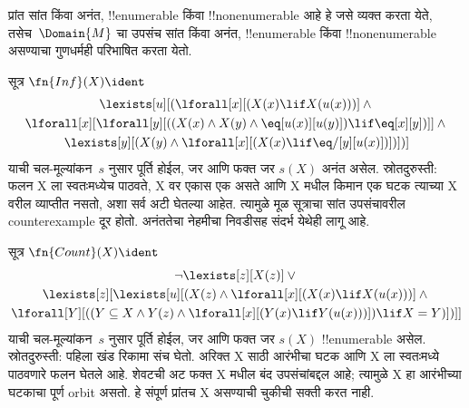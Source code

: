 \documentclass[../../../include/open-logic-section]{subfiles}
\begin{document}


\begin{explain}
प्रांत सांत किंवा अनंत, !!{enumerable} किंवा
!!{nonenumerable} आहे हे जसे व्यक्त करता येते,
तसेच~$\Domain{M}$ चा उपसंच सांत किंवा अनंत,
!!{enumerable} किंवा !!{nonenumerable} असण्याचा
गुणधर्मही परिभाषित करता येतो.
\end{explain}

\begin{prop}
सूत्र $\fn{Inf}(X) \ident$
\begin{multline*}
\lexists[u][(\lforall[x][(X(x) \lif X(u(x)))] \land {} \\
\lforall[x][\lforall[y][((X(x) \land X(y) \land \eq[u(x)][u(y)]) \lif
      \eq[x][y])]] \land {} \\
\lexists[y][(X(y) \land \lforall[x][(X(x) \lif \eq/[y][u(x)])])])]
\end{multline*}
याची चल-मूल्यांकन~$s$ नुसार पूर्ति होईल, जर आणि
फक्त जर $s(X)$ अनंत असेल. स्रोतदुरुस्ती: फलन
X ला स्वतःमध्येच पाठवते, X वर एकास एक असते आणि X मधील
किमान एक घटक त्याच्या X वरील व्याप्तीत नसतो, अशा सर्व अटी
घेतल्या आहेत. त्यामुळे मूळ सूत्राचा सांत उपसंचावरील counterexample
दूर होतो. अनंततेचा नेहमीचा निवडीसह संदर्भ येथेही लागू आहे.
\end{prop}

\begin{prop}
सूत्र $\fn{Count}(X) \ident $
\begin{multline*}
\lnot\lexists[z][X(z)] \lor {} \\
\lexists[z][\lexists[u][(X(z) \land
    \lforall[x][(X(x) \lif X(u(x)))] \land {} \\
\lforall[Y][((Y \subseteq X \land Y(z) \land
      \lforall[x][(Y(x) \lif Y(u(x)))]) \lif X = Y)])]]
\end{multline*}
याची चल-मूल्यांकन~$s$ नुसार पूर्ति होईल, जर आणि
फक्त जर $s(X)$ !!{enumerable} असेल. स्रोतदुरुस्ती:
पहिला खंड रिकामा संच घेतो. अरिक्त X साठी आरंभीचा घटक
आणि X ला स्वतःमध्ये पाठवणारे फलन घेतले आहे. शेवटची अट
फक्त X मधील बंद उपसंचांबद्दल आहे; त्यामुळे X हा आरंभीच्या
घटकाचा पूर्ण orbit असतो. हे संपूर्ण प्रांतच X असण्याची
चुकीची सक्ती करत नाही.
\end{prop}
\end{document}
